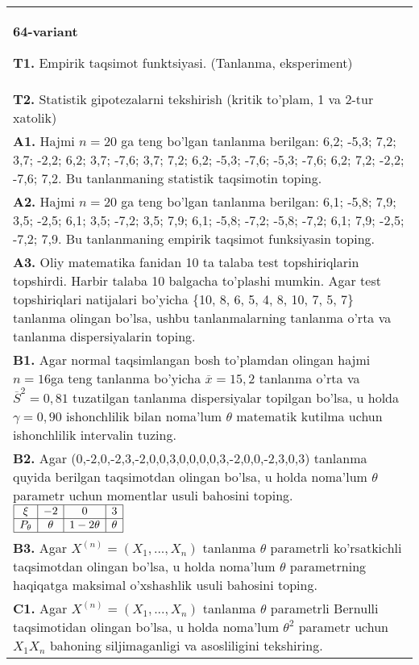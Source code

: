 \documentclass{article}
\begin{document}
\begin{tabular}{m{17cm}}
\textbf{64-variant}
\newline

\textbf{T1.} 
Empirik taqsimot funktsiyasi. (Tanlanma, eksperiment)
\\
\textbf{T2.} 
Statistik gipotezalarni tekshirish (kritik to'plam, 1 va 2-tur xatolik)
\\
\textbf{A1.} 
Hajmi \(n = 20\) ga teng bo'lgan tanlanma berilgan: 6,2; -5,3; 7,2; 3,7; -2,2; 6,2; 3,7; -7,6; 3,7; 7,2; 6,2; -5,3; -7,6; -5,3; -7,6; 6,2; 7,2; -2,2; -7,6; 7,2. Bu tanlanmaning statistik taqsimotin toping.
\\
\textbf{A2.} 
Hajmi \(n = 20\) ga teng bo'lgan tanlanma berilgan: 6,1; -5,8; 7,9; 3,5; -2,5; 6,1; 3,5; -7,2; 3,5; 7,9; 6,1; -5,8; -7,2; -5,8; -7,2; 6,1; 7,9; -2,5; -7,2; 7,9. Bu tanlanmaning empirik taqsimot funksiyasin toping.
\\
\textbf{A3.} 
Oliy matematika fanidan 10 ta talaba test topshiriqlarin topshirdi. Harbir talaba 10 balgacha to'plashi mumkin. Agar test topshiriqlari natijalari bo'yicha \{10, 8, 6, 5, 4, 8, 10, 7, 5, 7\} tanlanma olingan bo'lsa, ushbu tanlanmalarning tanlanma o'rta va tanlanma dispersiyalarin toping.
\\
\textbf{B1.} 
Agar normal taqsimlangan bosh to'plamdan olingan hajmi \(n = 16\)ga teng tanlanma bo'yicha \(\overline{x} = 15,2\) tanlanma o'rta va \({\overline{S}}^{2} = 0,81\) tuzatilgan tanlanma dispersiyalar topilgan bo'lsa, u holda \(\gamma = 0,90\) ishonchlilik bilan noma'lum \(\theta\) matematik kutilma uchun ishonchlilik intervalin tuzing.
\\
\textbf{B2.} 
Agar (0,-2,0,-2,3,-2,0,0,3,0,0,0,0,3,-2,0,0,-2,3,0,3) tanlanma quyida berilgan taqsimotdan olingan bo'lsa, u holda noma'lum \(\theta\) parametr uchun momentlar usuli bahosini toping.
$\begin{array}{|c|c|c|c|}
    \hline
    \xi & - 2 & 0 & 3 \\
    \hline
    P_{\theta} & \theta & 1 - 2\theta & \theta \\
    \hline
\end{array}$
\\
\textbf{B3.} 
Agar \(X^{(n)} = \left( X_{1},...,X_{n} \right)\) tanlanma \(\theta\) parametrli ko'rsatkichli taqsimotdan olingan bo'lsa, u holda noma'lum \(\theta\) parametrning haqiqatga maksimal o'xshashlik usuli bahosini toping.
\\
\textbf{C1.} 
Agar \(X^{(n)} = \left( X_{1},...,X_{n} \right)\) tanlanma \(\theta\) parametrli Bernulli taqsimotidan olingan bo'lsa, u holda noma'lum \(\theta^{2}\) parametr uchun \(X_{1}X_{n}\) bahoning siljimaganligi va asosliligini tekshiring.

\end{tabular}
\end{document}
